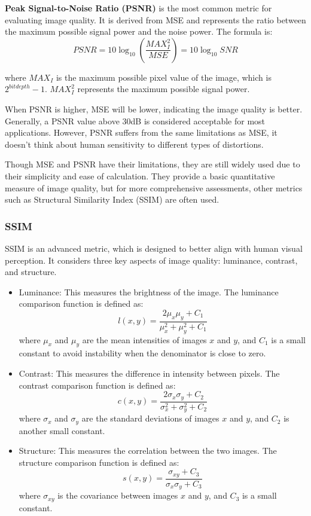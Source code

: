 \documentclass[12pt]{ctexart}
\begin{document}
\textbf{Peak Signal-to-Noise Ratio (PSNR)} is the most common metric for evaluating image
quality. It is derived from MSE and represents the ratio between the maximum possible
signal power and the noise power. The formula is:
\[
  PSNR = 10 \log_{10} \left( \frac{MAX_I^2}{MSE} \right) = 10 \log_{10} SNR
\]

where $MAX_I$ is the maximum possible pixel value of the image, which is $2^{bit depth} - 1$.
$MAX_I^{2}$ represents the maximum possible signal power.

When PSNR is higher, MSE will be lower, indicating the image quality is better. Generally,
a PSNR value above 30dB is considered acceptable for most applications. However, PSNR suffers
from the same limitations as MSE, it doesn't think about human sensitivity to different types
of distortions.

Though MSE and PSNR have their limitations, they are still widely used due to their simplicity
and ease of calculation. They provide a basic quantitative measure of image quality, but for
more comprehensive assessments, other metrics such as Structural Similarity Index (SSIM) are
often used.

\subsubsection{\textbf{SSIM}}

SSIM is an advanced metric, which is designed to better align with human visual perception.
It considers three key aspects of image quality: luminance, contrast, and structure.
\begin{itemize}
  \item Luminance: This measures the brightness of the image. The luminance comparison
  function is defined as:
  \[
    l(x,y) = \frac{2\mu_x \mu_y + C_1}{\mu_x^2 + \mu_y^2 + C_1}
  \]
  where $\mu_x$ and $\mu_y$ are the mean intensities of images $x$ and $y$, and $C_1$ is a
  small constant to avoid instability when the denominator is close to zero.

  \item Contrast: This measures the difference in intensity between pixels. The contrast
  comparison function is defined as:
  \[
    c(x,y) = \frac{2\sigma_x \sigma_y + C_2}{\sigma_x^2 + \sigma_y^2 + C_2}
  \]
  where $\sigma_x$ and $\sigma_y$ are the standard deviations of images $x$ and $y$, and
  $C_2$ is another small constant.

  \item Structure: This measures the correlation between the two images. The structure
  comparison function is defined as:
  \[
    s(x,y) = \frac{\sigma_{xy} + C_3}{\sigma_x \sigma_y + C_3}
  \]
  where $\sigma_{xy}$ is the covariance between images $x$ and $y$, and $C_3$ is a small
  constant.
\end{itemize}
\end{document}
